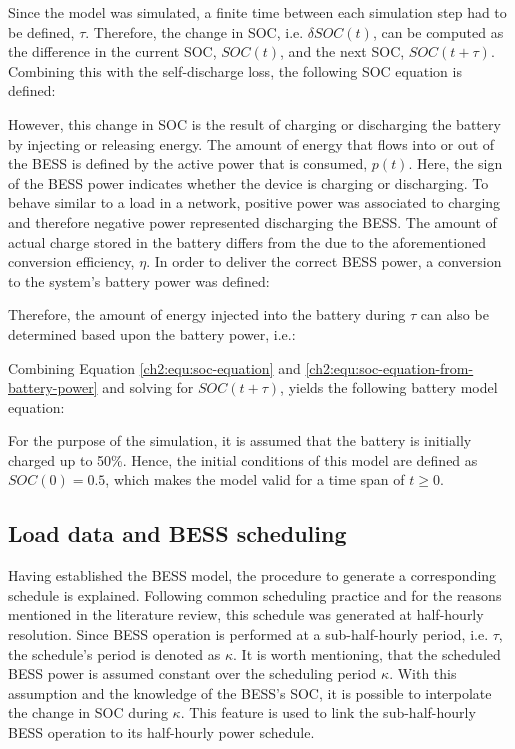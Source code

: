 Since the model was simulated, a finite time between each simulation step had to be defined, $\tau$.
Therefore, the change in SOC, i.e. $\delta SOC(t)$, can be computed as the difference in the current SOC, $SOC(t)$, and the next SOC, $SOC(t+\tau)$.
Combining this with the self-discharge loss, the following SOC equation is defined:



However, this change in SOC is the result of charging or discharging the battery by injecting or releasing energy.
The amount of energy that flows into or out of the BESS is defined by the active power that is consumed, $p(t)$.
Here, the sign of the BESS power indicates whether the device is charging or discharging.
To behave similar to a load in a network, positive power was associated to charging and therefore negative power represented discharging the BESS.
The amount of actual charge stored in the battery differs from the due to the aforementioned conversion efficiency, $\eta$.
In order to deliver the correct BESS power, a conversion to the system's battery power was defined:



Therefore, the amount of energy injected into the battery during $\tau$ can also be determined based upon the battery power, i.e.:



Combining Equation \ref{ch2:equ:soc-equation} and \ref{ch2:equ:soc-equation-from-battery-power} and solving for $SOC(t+\tau)$, yields the following battery model equation:



For the purpose of the simulation, it is assumed that the battery is initially charged up to 50\%.
Hence, the initial conditions of this model are defined as $SOC(0) = 0.5$, which makes the model valid for a time span of $t \geq 0$.

\subsection{Load data and BESS scheduling}

Having established the BESS model, the procedure to generate a corresponding schedule is explained.
Following common scheduling practice and for the reasons mentioned in the literature review, this schedule was generated at half-hourly resolution.
Since BESS operation is performed at a sub-half-hourly period, i.e. $\tau$, the schedule's period is denoted as $\kappa$.
It is worth mentioning, that the scheduled BESS power is assumed constant over the scheduling period $\kappa$.
With this assumption and the knowledge of the BESS's SOC, it is possible to interpolate the change in SOC during $\kappa$.
This feature is used to link the sub-half-hourly BESS operation to its half-hourly power schedule.

